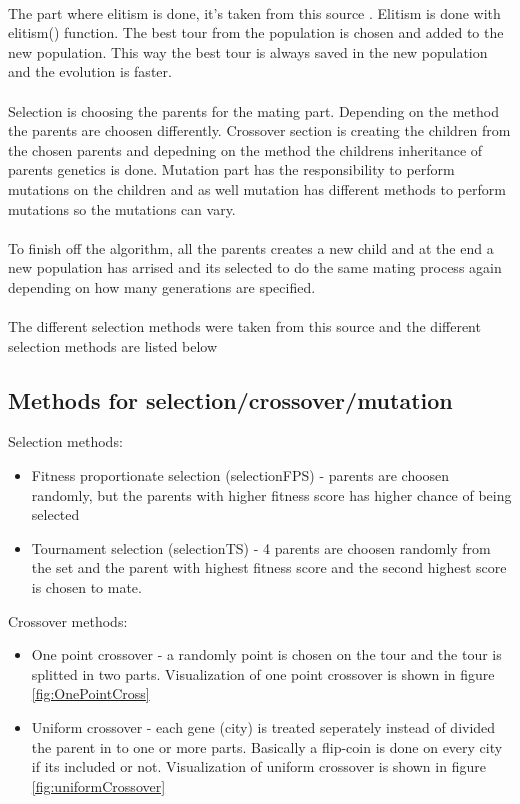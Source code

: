 \documentclass[12pt]{report}
\begin{document}
    \\
    The part where elitism is done, it's taken from this source \cite{Elitismsource}. Elitism is done with elitism() function. The best tour from the population is chosen and added to the new population. This way the best tour is always saved in the new population and the evolution is faster.\\
    \\
    Selection is choosing the parents for the mating part. Depending on the method the parents are choosen differently. Crossover section is creating the children from the chosen parents and depedning on the method the childrens inheritance of parents genetics is done. Mutation part has the responsibility to perform mutations on the children and as well mutation has different methods to perform mutations so the mutations can vary.\\
    \\
    To finish off the algorithm, all the parents creates a new child and at the end a new population has arrised and its selected to do the same mating process again depending on how many generations are specified.\\
    \\
    The different selection methods were taken from this source \cite{Elitismsource} and the different selection methods are listed below 
    \subsection{Methods for selection/crossover/mutation}
    Selection methods: \cite{Elitismsource}
    \begin{itemize}
        \item Fitness proportionate selection (selectionFPS) - parents are choosen randomly, but the parents with higher fitness score has higher chance of being selected
        \item Tournament selection (selectionTS) - 4 parents are choosen randomly from the set and the parent with highest fitness score and the second highest score is chosen to mate.
    \end{itemize}
    Crossover methods: \cite{CrossoverSource} 
    \begin{itemize}
        \item One point crossover - a randomly point is chosen on the tour and the tour is splitted in two parts. Visualization of one point crossover is shown in figure \ref{fig:OnePointCross}
        \item Uniform crossover - each gene (city) is treated seperately instead of divided the parent in to one or more parts. Basically a flip-coin is done on every city if its included or not. Visualization of uniform crossover is shown in figure \ref{fig:uniformCrossover}
    \end{itemize}
    
\end{document}
